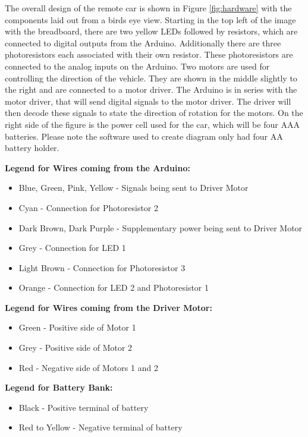 \documentclass[letterpaper,12pt]{report}
\begin{document}
    The overall design of the remote car is shown in Figure \ref{fig:hardware}
    with the components laid out from a birds eye view. Starting in the top
    left of the image with the breadboard, there are two yellow LEDs followed by
    resistors, which are connected to digital outputs from the Arduino.
    Additionally there are three photoresistors each associated with their own
    resistor. These photoresistors are connected to the analog inputs on the
    Arduino. Two motors are used for controlling the direction of the vehicle.
    They are shown in the middle slightly to the right and are connected to a
    motor driver. The Arduino is in series with the motor driver, that will send
    digital signals to the motor driver. The driver will then decode these
    signals to state the direction of rotation for the motors. On the right side
    of the figure is the power cell used for the car, which will be four AAA
    batteries. Please note the software used to create diagram only had four AA
    battery holder.

    \textbf{Legend for Wires coming from the Arduino:}
    \begin{itemize}
        \item Blue, Green, Pink, Yellow - Signals being sent to Driver Motor
        \item Cyan - Connection for Photoresistor 2
        \item Dark Brown, Dark Purple - Supplementary power being sent to Driver Motor
        \item Grey - Connection for LED 1
        \item Light Brown - Connection for Photoresistor 3
        \item Orange - Connection for LED 2 and Photoresistor 1
    \end{itemize}

    \textbf{Legend for Wires coming from the Driver Motor:}
    \begin{itemize}
        \item Green - Positive side of Motor 1
        \item Grey - Positive side of Motor 2
        \item Red - Negative side of Motors 1 and 2
    \end{itemize}

    \textbf{Legend for Battery Bank:}
    \begin{itemize}
        \item Black - Positive terminal of battery
        \item Red to Yellow - Negative terminal of battery
    \end{itemize}
\end{document}
